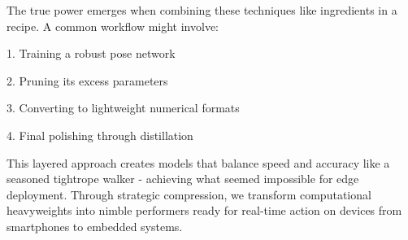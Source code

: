 The true power emerges when combining these techniques like ingredients in a recipe. A common workflow might involve:

1. Training a robust pose network

2. Pruning its excess parameters

3. Converting to lightweight numerical formats

4. Final polishing through distillation

This layered approach creates models that balance speed and accuracy like a seasoned tightrope walker - achieving what seemed impossible for edge deployment. Through strategic compression, we transform computational heavyweights into nimble performers ready for real-time action on devices from smartphones to embedded systems.